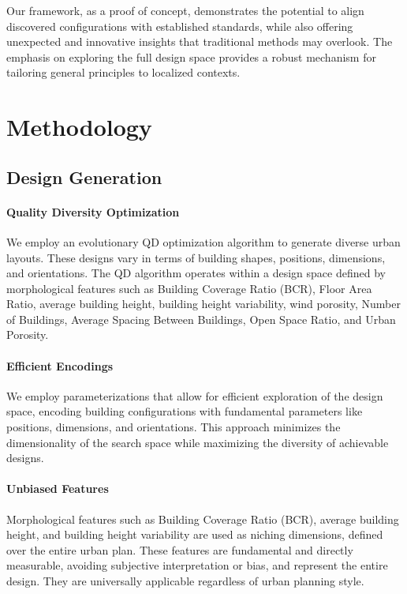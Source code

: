 \documentclass[times,final]{elsarticle}
\begin{document}
Our framework, as a proof of concept, demonstrates the potential to align discovered configurations with established standards, while also offering unexpected and innovative insights that traditional methods may overlook. The emphasis on exploring the full design space provides a robust mechanism for tailoring general principles to localized contexts.

\section{Methodology}

\subsection{Design Generation}

\paragraph{Quality Diversity Optimization}

We employ an evolutionary QD optimization algorithm to generate diverse
urban layouts. These designs vary in terms of building shapes,
positions, dimensions, and orientations. The QD algorithm operates
within a design space defined by morphological features such as Building
Coverage Ratio (BCR), Floor Area Ratio, average building height,
building height variability, wind porosity, Number of Buildings, Average
Spacing Between Buildings, Open Space Ratio, and Urban Porosity.


\paragraph{Efficient Encodings}

We employ parameterizations that allow for efficient exploration of the
design space, encoding building configurations with fundamental
parameters like positions, dimensions, and orientations. This approach
minimizes the dimensionality of the search space while maximizing the
diversity of achievable designs.


\paragraph{Unbiased Features}


Morphological features such as Building Coverage Ratio (BCR), average
building height, and building height variability are used as niching
dimensions, defined over the entire urban plan. These features are
fundamental and directly measurable, avoiding subjective interpretation
or bias, and represent the entire design. They are universally applicable regardless of urban planning style.
\end{document}
